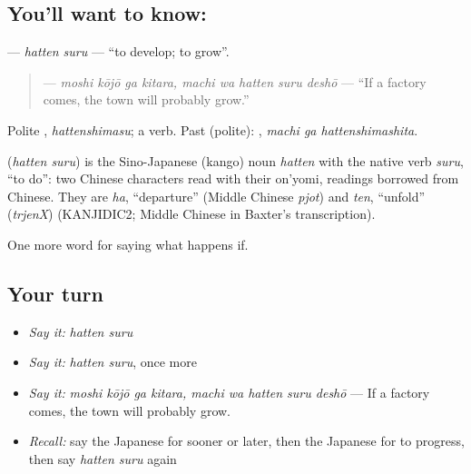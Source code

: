 \subsection*{You'll want to know: }
\textbf{} — \emph{hatten suru} — \textquotedblleft{}to develop; to grow\textquotedblright{}.

\begin{quote}
\textbf{   } — \emph{moshi kōjō ga kitara, machi wa hatten suru deshō} — \textquotedblleft{}If a factory comes, the town will probably grow.\textquotedblright{}
\end{quote}

Polite \textbf{}, \emph{hattenshimasu}; a  verb. Past (polite): \textbf{ }, \emph{machi ga hattenshimashita}.

\begin{cousinweb}
\textbf{} (\emph{hatten suru}) is the Sino-Japanese (kango) noun \emph{hatten} with the native verb \emph{suru}, \textquotedblleft{}to do\textquotedblright{}: two Chinese characters read with their on'yomi, readings borrowed from Chinese. They are \emph{ha}, \textquotedblleft{}departure\textquotedblright{} (Middle Chinese \emph{pjot}) and \emph{ten}, \textquotedblleft{}unfold\textquotedblright{} (\emph{trjenX}) (KANJIDIC2; Middle Chinese in Baxter's transcription).
\end{cousinweb}

\begin{grammarlens}[title={What you've built}]
One more word for saying what happens if.
\end{grammarlens}

\subsection*{Your turn}
\begin{itemize}
\raggedright
  \item \emph{Say it:} \emph{hatten suru}
  \item \emph{Say it:} \emph{hatten suru}, once more
  \item \emph{Say it:} \emph{moshi kōjō ga kitara, machi wa hatten suru deshō} — If a factory comes, the town will probably grow.
  \item \emph{Recall:} say the Japanese for sooner or later, then the Japanese for to progress, then say \emph{hatten suru} again
\end{itemize}

